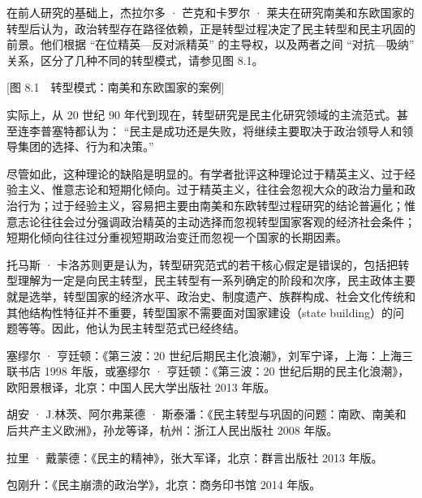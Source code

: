 在前人研究的基础上，杰拉尔多 · 芒克和卡罗尔 · 莱夫在研究南美和东欧国家的转型后认为，政治转型存在路径依赖，正是转型过程决定了民主转型和民主巩固的前景。他们根据 “在位精英—反对派精英” 的主导权，以及两者之间 “对抗—吸纳” 关系，区分了几种不同的转型模式，请参见图 8.1。

[图 8.1　转型模式：南美和东欧国家的案例]

实际上，从 20 世纪 90 年代到现在，转型研究是民主化研究领域的主流范式。甚至连李普塞特都认为： “民主是成功还是失败，将继续主要取决于政治领导人和领导集团的选择、行为和决策。” 

尽管如此，这种理论的缺陷是明显的。有学者批评这种理论过于精英主义、过于经验主义、惟意志论和短期化倾向。过于精英主义，往往会忽视大众的政治力量和政治行为；过于经验主义，容易把主要由南美和东欧转型过程研究的结论普遍化；惟意志论往往会过分强调政治精英的主动选择而忽视转型国家客观的经济社会条件；短期化倾向往往过分重视短期政治变迁而忽视一个国家的长期因素。

托马斯 · 卡洛苏则更是认为，转型研究范式的若干核心假定是错误的，包括把转型理解为一定是向民主转型，民主转型有一系列确定的阶段和次序，民主政体主要就是选举，转型国家的经济水平、政治史、制度遗产、族群构成、社会文化传统和其他结构性特征并不重要，转型国家不需要面对国家建设（state building）的问题等等。因此，他认为民主转型范式已经终结。


塞缪尔 · 亨廷顿：《第三波：20 世纪后期民主化浪潮》，刘军宁译，上海：上海三联书店 1998 年版，或塞缪尔 · 亨廷顿：《第三波：20 世纪后期的民主化浪潮》，欧阳景根译，北京：中国人民大学出版社 2013 年版。

胡安 · J.林茨、阿尔弗莱德 · 斯泰潘：《民主转型与巩固的问题：南欧、南美和后共产主义欧洲》，孙龙等译，杭州：浙江人民出版社 2008 年版。

拉里 · 戴蒙德：《民主的精神》，张大军译，北京：群言出版社 2013 年版。

包刚升：《民主崩溃的政治学》，北京：商务印书馆 2014 年版。
